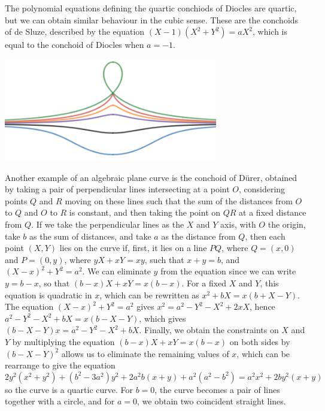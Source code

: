 \begin{example}
    The polynomial equations defining the quartic conchiods of Diocles are quartic, but we can obtain similar behaviour in the cubic sense. These are the conchoids of de Sluze, described by the equation $(X-1)(X^2 + Y^2) = aX^2$, which is equal to the conchoid of Diocles when $a = -1$.

    \begin{center}
        \includegraphics[width=0.7\textwidth]{algebraicGeometryConchoidDesluze}
    \end{center}
\end{example}

\begin{example}
    Another example of an algebraic plane curve is the conchoid of D\"{u}rer, obtained by taking a pair of perpendicular lines intersecting at a point $O$, considering points $Q$ and $R$ moving on these lines such that the sum of the distances from $O$ to $Q$ and $O$ to $R$ is constant, and then taking the point on $QR$ at a fixed distance from $Q$. If we take the perpendicular lines as the $X$ and $Y$ axis, with $O$ the origin, take $b$ as the sum of distances, and take $a$ as the distance from $Q$, then each point $(X,Y)$ lies on the curve if, first, it lies on a line $PQ$, where $Q = (x,0)$ and $P = (0,y)$, where $yX + xY = xy$, such that $x + y = b$, and $(X - x)^2 + Y^2 = a^2$. We can eliminate $y$ from the equation since we can write $y = b -x$, so that $(b-x)X + xY = x(b-x)$. For a fixed $X$ and $Y$, this equation is quadratic in $x$, which can be rewritten as $x^2 + bX = x(b + X - Y)$. The equation $(X - x)^2 + Y^2 = a^2$ gives $x^2 = a^2 - Y^2 - X^2 + 2xX$, hence $a^2 - Y^2 - X^2 + bX = x(b - X - Y)$, which gives $(b - X - Y)x = a^2 - Y^2 - X^2 + bX$. Finally, we obtain the constraints on $X$ and $Y$ by multiplying the equation $(b - x)X + xY = x(b - x)$ on both sides by $(b - X - Y)^2$ allows us to eliminate the remaining values of $x$, which can be rearrange to give the equation
    \[ 2y^2(x^2 + y^2) + (b^2 - 3a^2)y^2 + 2a^2b(x + y) + a^2(a^2 - b^2) = a^2x^2 + 2by^2(x + y) \]
    so the curve is a quartic curve. For $b = 0$, the curve becomes a pair of lines together with a circle, and for $a = 0$, we obtain two coincident straight lines.
\end{example}

